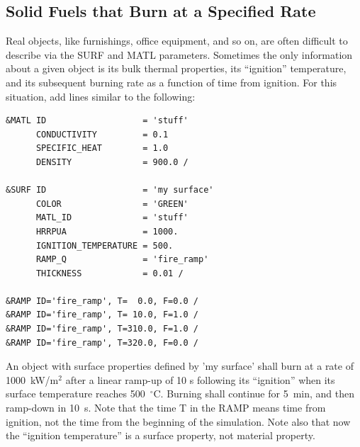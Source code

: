 \documentclass[11pt]{book}
\begin{document}
\subsection{Solid Fuels that Burn at a Specified Rate}
\label{info:specified_burning}

Real objects, like furnishings, office equipment, and so on, are
often difficult to describe via the {\ct SURF} and {\ct MATL}
parameters. Sometimes the only information about a given object is its
bulk thermal properties, its ``ignition'' temperature, and its
subsequent burning rate as a function of time from ignition. For
this situation, add lines similar to the following:
\begin{lstlisting}
&MATL ID                   = 'stuff'
      CONDUCTIVITY         = 0.1
      SPECIFIC_HEAT        = 1.0
      DENSITY              = 900.0 /

&SURF ID                   = 'my surface'
      COLOR                = 'GREEN'
      MATL_ID              = 'stuff'
      HRRPUA               = 1000.
      IGNITION_TEMPERATURE = 500.
      RAMP_Q               = 'fire_ramp'
      THICKNESS            = 0.01 /

&RAMP ID='fire_ramp', T=  0.0, F=0.0 /
&RAMP ID='fire_ramp', T= 10.0, F=1.0 /
&RAMP ID='fire_ramp', T=310.0, F=1.0 /
&RAMP ID='fire_ramp', T=320.0, F=0.0 /
\end{lstlisting}
An object with surface properties defined by {\ct 'my surface'} shall
burn at a rate of 1000~kW/m$^2$ after a linear ramp-up of 10 s
following its ``ignition'' when its surface temperature reaches
500~$^\circ$C. Burning shall continue for 5~min, and then ramp-down
in 10~s. Note that the time {\ct T} in the {\ct RAMP} means time from
ignition, not the time from the beginning of the simulation. Note also that now the ``ignition temperature'' is a surface
property, not material property.
\end{document}
